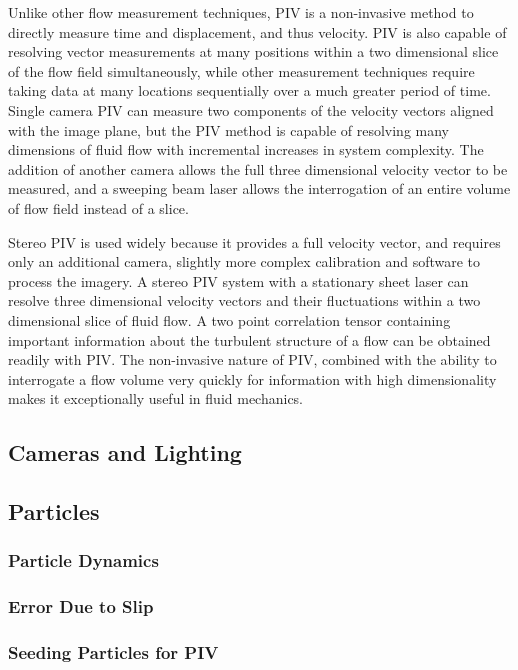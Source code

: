 Unlike other flow measurement techniques, PIV is a non-invasive method to 
directly measure time and displacement, and thus velocity. PIV is also capable 
of resolving vector measurements at many positions within a two dimensional 
slice of the flow field simultaneously, while other measurement techniques 
require taking data at many locations sequentially over a much greater period 
of time. Single camera PIV can measure two components of the velocity vectors 
aligned with the image plane, but the PIV method is capable of resolving many 
dimensions of fluid flow with incremental increases in system complexity. The 
addition of another camera allows the full three dimensional velocity vector to 
be measured, and a sweeping beam laser allows the interrogation of an entire 
volume of flow field instead of a slice.

Stereo PIV is used widely because it provides a full velocity vector, and 
requires only an additional camera, slightly more complex calibration and 
software to process the imagery.  A stereo PIV system with a 
stationary sheet laser can resolve three dimensional velocity vectors and their 
fluctuations within a two dimensional slice of fluid flow. A two point 
correlation tensor containing important information about the turbulent 
structure of a flow can be obtained readily with PIV. The non-invasive nature 
of PIV, combined with the  ability to interrogate a flow volume very quickly 
for information with high dimensionality makes it exceptionally useful in fluid 
mechanics. \cite{adrian1991}

\subsection{Cameras and Lighting}

\subsection{Particles}

\subsubsection{Particle Dynamics} 

\subsubsection{Error Due to Slip}

\subsubsection{Seeding Particles for PIV}

